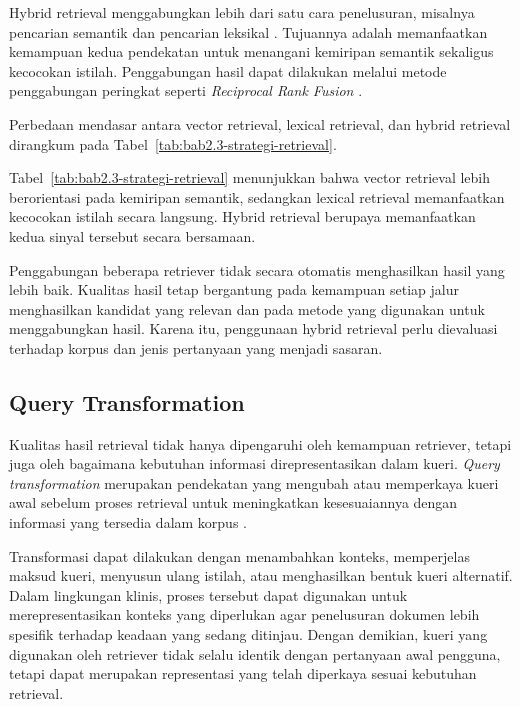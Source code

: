 Hybrid retrieval menggabungkan lebih dari satu cara penelusuran, misalnya pencarian semantik dan pencarian leksikal \parencite{gao2023}. Tujuannya adalah memanfaatkan kemampuan kedua pendekatan 
untuk menangani kemiripan semantik sekaligus kecocokan istilah. Penggabungan hasil dapat dilakukan melalui metode penggabungan peringkat seperti \textit{Reciprocal Rank Fusion} \parencite{xiong2024}.

Perbedaan mendasar antara vector retrieval, lexical retrieval, dan hybrid retrieval dirangkum pada Tabel~\ref{tab:bab2.3-strategi-retrieval}.



Tabel~\ref{tab:bab2.3-strategi-retrieval} menunjukkan bahwa vector retrieval lebih berorientasi pada kemiripan semantik, sedangkan lexical retrieval memanfaatkan kecocokan istilah 
secara langsung. Hybrid retrieval berupaya memanfaatkan kedua sinyal tersebut secara bersamaan.

Penggabungan beberapa retriever tidak secara otomatis menghasilkan hasil yang lebih baik. Kualitas hasil tetap bergantung pada kemampuan setiap jalur menghasilkan kandidat yang 
relevan dan pada metode yang digunakan untuk menggabungkan hasil. Karena itu, penggunaan hybrid retrieval perlu dievaluasi terhadap korpus dan jenis pertanyaan yang menjadi sasaran.

\subsection{Query Transformation}
\label{subsec:bab2-query-transformation}

Kualitas hasil retrieval tidak hanya dipengaruhi oleh kemampuan retriever, tetapi juga oleh bagaimana kebutuhan informasi direpresentasikan dalam kueri. \textit{Query transformation} 
merupakan pendekatan yang mengubah atau memperkaya kueri awal sebelum proses retrieval untuk meningkatkan kesesuaiannya dengan informasi yang tersedia dalam korpus \parencite{gao2023}.

Transformasi dapat dilakukan dengan menambahkan konteks, memperjelas maksud kueri, menyusun ulang istilah, atau menghasilkan bentuk kueri alternatif. Dalam lingkungan klinis, 
proses tersebut dapat digunakan untuk merepresentasikan konteks yang diperlukan agar penelusuran dokumen lebih spesifik terhadap keadaan yang sedang ditinjau. Dengan demikian, 
kueri yang digunakan oleh retriever tidak selalu identik dengan pertanyaan awal pengguna, tetapi dapat merupakan representasi yang telah diperkaya sesuai kebutuhan retrieval.

